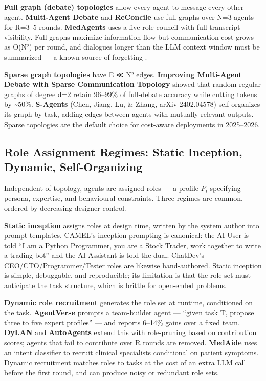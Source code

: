 \documentclass{article}
\begin{document}
\textbf{Full graph (debate) topologies} allow every agent to message every other agent. \textbf{Multi-Agent Debate} \citep{liang2024encouragingdiverge} and \textbf{ReConcile} \citep{chen2024asurveyonllmbasedm} use full graphs over N=3 agents for R=3--5 rounds. \textbf{MedAgents} \citep{tang2024medagentslargelang} uses a five-role council with full-transcript visibility. Full graphs maximize information flow but communication cost grows as O(N²) per round, and dialogues longer than the LLM context window must be summarized --- a known source of forgetting \citep{liu20242024}.

\textbf{Sparse graph topologies} have \textbar E\textbar{} ≪ N² edges. \textbf{Improving Multi-Agent Debate with Sparse Communication Topology} \citep{li2024asurveyonllmbasedm} showed that random regular graphs of degree d=2 retain 96--99\% of full-debate accuracy while cutting tokens by \textasciitilde50\%. \textbf{S-Agents} (Chen, Jiang, Lu, \& Zhang, arXiv 2402.04578) self-organizes its graph by task, adding edges between agents with mutually relevant outputs. Sparse topologies are the default choice for cost-aware deployments in 2025--2026.

\subsection{Role Assignment Regimes: Static Inception, Dynamic, Self-Organizing}\label{role-assignment-regimes-static-inception-dynamic-self-organizing}

Independent of topology, agents are assigned roles --- a profile \(P_i\) specifying persona, expertise, and behavioural constraints. Three regimes are common, ordered by decreasing designer control.

\textbf{Static inception} assigns roles at design time, written by the system author into prompt templates. CAMEL's inception prompting is canonical: the AI-User is told ``I am a Python Programmer, you are a Stock Trader, work together to write a trading bot'' and the AI-Assistant is told the dual. ChatDev's CEO/CTO/Programmer/Tester roles are likewise hand-authored. Static inception is simple, debuggable, and reproducible; its limitation is that the role set must anticipate the task structure, which is brittle for open-ended problems.

\textbf{Dynamic role recruitment} generates the role set at runtime, conditioned on the task. \textbf{AgentVerse} \citep{chen2024asurveyonllmbasedm} prompts a team-builder agent --- ``given task T, propose three to five expert profiles'' --- and reports 6--14\% gains over a fixed team. \textbf{DyLAN} and \textbf{AutoAgents} \citep{chen2024asurveyonllmbasedm} extend this with role-pruning based on contribution scores; agents that fail to contribute over R rounds are removed. \textbf{MedAide} \citep{yang20242024} uses an intent classifier to recruit clinical specialists conditional on patient symptoms. Dynamic recruitment matches roles to tasks at the cost of an extra LLM call before the first round, and can produce noisy or redundant role sets.
\end{document}
